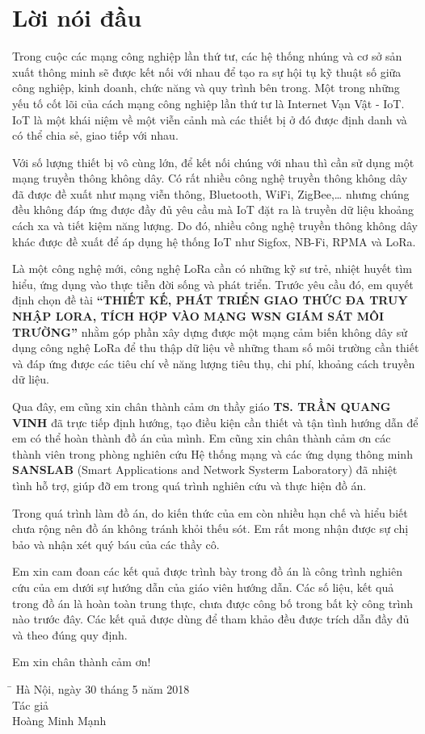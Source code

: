 \thispagestyle{plain}
\chapter*{Lời nói đầu}
Trong cuộc các mạng công nghiệp lần thứ tư, các hệ thống nhúng và cơ sở sản xuất thông minh sẽ được kết nối với nhau để tạo ra sự hội tụ kỹ thuật số giữa công nghiệp, kinh doanh, chức năng và quy trình bên trong. Một trong những yếu tố cốt lõi của cách mạng công nghiệp lần thứ tư là Internet Vạn Vật - IoT. IoT là một khái niệm về một viễn cảnh mà các thiết bị ở đó được định danh và có thể chia sẻ, giao tiếp với nhau.
\par
Với số lượng thiết bị vô cùng lớn, để kết nối chúng với nhau thì cần sử dụng một mạng truyền thông không dây. Có rất nhiều công nghệ truyền thông không dây đã được đề xuất như mạng viễn thông, Bluetooth, WiFi, ZigBee,… nhưng chúng đều không đáp ứng được đầy đủ yêu cầu mà IoT đặt ra là truyền dữ liệu khoảng cách xa và tiết kiệm năng lượng. Do đó, nhiều công nghệ truyền thông không dây khác được đề xuất để áp dụng hệ thống IoT như Sigfox, NB-Fi, RPMA và LoRa.
\par 
Là một công nghệ mới, công nghệ LoRa cần có những kỹ sư trẻ, nhiệt huyết tìm hiểu, ứng dụng vào thực tiễn đời sống và phát triển. Trước yêu cầu đó, em quyết định chọn đề tài \textbf{“THIẾT KẾ, PHÁT TRIỂN GIAO THỨC ĐA TRUY NHẬP LORA, TÍCH HỢP VÀO MẠNG WSN GIÁM SÁT MÔI TRƯỜNG”} nhằm góp phần xây dựng được một mạng cảm biến không dây sử dụng công nghệ LoRa để thu thập dữ liệu về những tham số môi trường cần thiết và đáp ứng được các tiêu chí về năng lượng tiêu thụ, chi phí, khoảng cách truyền dữ liệu.
\par
Qua đây, em cũng xin chân thành cảm ơn thầy giáo \textbf{TS. TRẦN QUANG VINH} đã trực tiếp định hướng, tạo điều kiện cần thiết và tận tình hướng dẫn để em có thể hoàn thành đồ án của mình. Em cũng xin chân thành cảm ơn các thành viên trong phòng nghiên cứu Hệ thống mạng và các ứng dụng thông minh \textbf{SANSLAB} (Smart Applications and Network Systerm Laboratory) đã nhiệt tình hỗ trợ, giúp đỡ em trong quá trình nghiên cứu và thực hiện đồ án.
\par
Trong quá trình làm đồ án, do kiến thức của em còn nhiều hạn chế và hiểu biết chưa rộng nên đồ án không tránh khỏi thếu sót. Em rất mong nhận được sự chị bảo và nhận xét quý báu của các thầy cô.
\par 
Em xin cam đoan các kết quả được trình bày trong đồ án là công trình nghiên cứu của em dưới sự hướng dẫn của giáo viên hướng dẫn. Các số liệu, kết quả trong đồ án là hoàn toàn trung thực, chưa được công bố trong bất kỳ công trình nào trước đây. Các kết quả được dùng để tham khảo đều được trích dẫn đầy đủ và theo đúng quy định.
\par 
Em xin chân thành cảm ơn!
\begin{tabbing}
 \hspace{8cm}\=\kill
   \> Hà Nội, ngày 30 tháng 5 năm 2018 \\ 
   \>  \hspace{2.5cm}    Tác giả\\ 
   \>   \hspace{1.5cm}  Hoàng Minh Mạnh		
 \end{tabbing} 